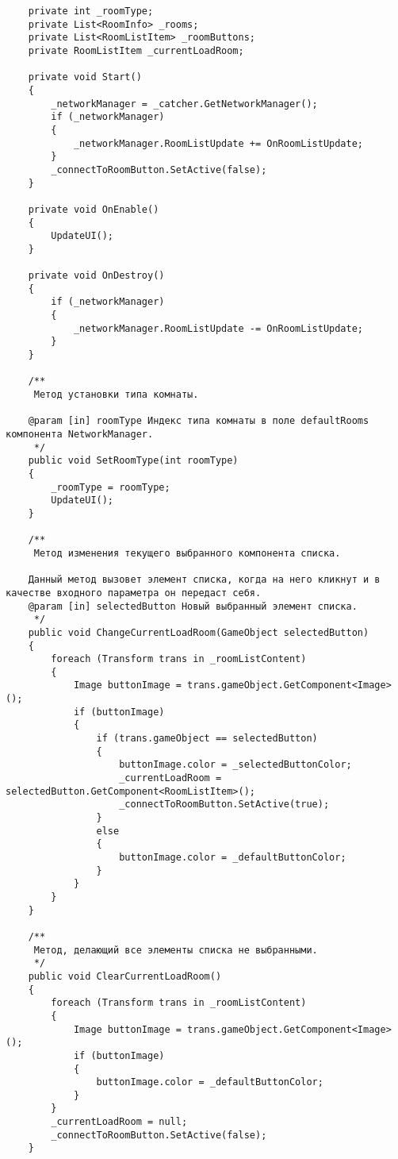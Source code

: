 \begin{verbatim}
    private int _roomType;
    private List<RoomInfo> _rooms;
    private List<RoomListItem> _roomButtons;
    private RoomListItem _currentLoadRoom;

    private void Start()
    {
        _networkManager = _catcher.GetNetworkManager();
        if (_networkManager)
        {
            _networkManager.RoomListUpdate += OnRoomListUpdate;
        }
        _connectToRoomButton.SetActive(false);
    }

    private void OnEnable()
    {
        UpdateUI();
    }

    private void OnDestroy()
    {
        if (_networkManager)
        {
            _networkManager.RoomListUpdate -= OnRoomListUpdate;
        }
    }

    /**
     Метод установки типа комнаты.

    @param [in] roomType Индекс типа комнаты в поле defaultRooms компонента NetworkManager.
     */
    public void SetRoomType(int roomType)
    {
        _roomType = roomType;
        UpdateUI();
    }

    /**
     Метод изменения текущего выбранного компонента списка.

    Данный метод вызовет элемент списка, когда на него кликнут и в качестве входного параметра он передаст себя.
    @param [in] selectedButton Новый выбранный элемент списка.
     */
    public void ChangeCurrentLoadRoom(GameObject selectedButton)
    {
        foreach (Transform trans in _roomListContent)
        {
            Image buttonImage = trans.gameObject.GetComponent<Image>();
            if (buttonImage)
            {
                if (trans.gameObject == selectedButton)
                {
                    buttonImage.color = _selectedButtonColor;
                    _currentLoadRoom = selectedButton.GetComponent<RoomListItem>();
                    _connectToRoomButton.SetActive(true);
                }
                else
                {
                    buttonImage.color = _defaultButtonColor;
                }
            }
        }
    }

    /**
     Метод, делающий все элементы списка не выбранными.
     */
    public void ClearCurrentLoadRoom()
    {
        foreach (Transform trans in _roomListContent)
        {
            Image buttonImage = trans.gameObject.GetComponent<Image>();
            if (buttonImage)
            {
                buttonImage.color = _defaultButtonColor;
            }
        }
        _currentLoadRoom = null;
        _connectToRoomButton.SetActive(false);
    }


\end{verbatim}
